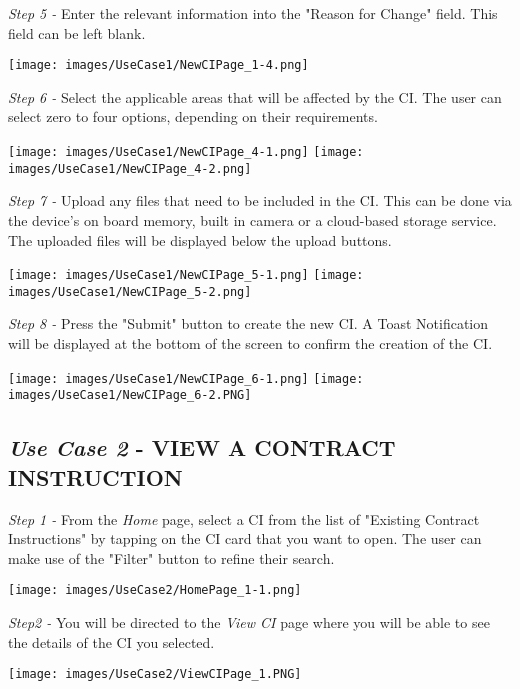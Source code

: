 \documentclass[11pt]{article}
\begin{document}
        \textit{Step 5 -} Enter the relevant information into the "Reason for Change" field. This field can be left blank.\\[0.5cm]
        \begin{center}
            \texttt{[image: images/UseCase1/NewCIPage\_1-4.png]}
        \end{center}
        \textit{Step 6 -} Select the applicable areas that will be affected by the CI. The user can select zero to four options, depending on their requirements.\\[0.5cm]
        \begin{center}
            \texttt{[image: images/UseCase1/NewCIPage\_4-1.png]}
            \texttt{[image: images/UseCase1/NewCIPage\_4-2.png]}
        \end{center}
        \textit{Step 7 -} Upload any files that need to be included in the CI. This can be done via the device's on board memory, built in camera or a cloud-based storage service. The uploaded files will be displayed below the upload buttons.\\[0.5cm]
        \begin{center}
            \texttt{[image: images/UseCase1/NewCIPage\_5-1.png]}
            \texttt{[image: images/UseCase1/NewCIPage\_5-2.png]}
        \end{center}
        \textit{Step 8 -} Press the "Submit" button to create the new CI. A Toast Notification will be displayed at the bottom of the screen to confirm the creation of the CI.\\[0.5cm]
        \begin{center}
            \texttt{[image: images/UseCase1/NewCIPage\_6-1.png]}
            \texttt{[image: images/UseCase1/NewCIPage\_6-2.PNG]}
        \end{center}
    \subsection{\textit{Use Case 2} - \uppercase{View a Contract Instruction}}
            \textit{Step 1 -} From the \textit{Home} page, select a CI from the list of "Existing Contract Instructions" by tapping on the CI card that you want to open. The user can make use of the "Filter" button to refine their search.\\[0.5cm]
            \begin{center}
                \texttt{[image: images/UseCase2/HomePage\_1-1.png]}
            \end{center}
            \textit{Step2 - } You will be directed to the \textit{View CI} page where you will be able to see the details of the CI you selected.\\[0.5cm]
            \begin{center}
                \texttt{[image: images/UseCase2/ViewCIPage\_1.PNG]}
            \end{center}
\end{document}
